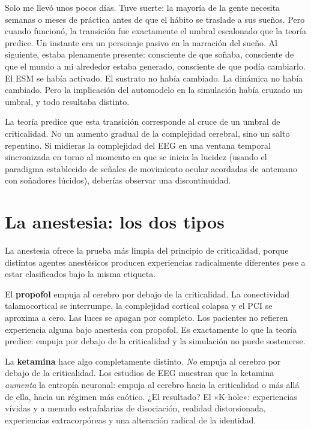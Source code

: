 \documentclass[11pt, twoside, openright]{book}
\begin{document}
Solo me llevó unos pocos días. Tuve suerte: la mayoría de la gente necesita semanas o meses de práctica antes de que el hábito se traslade a sus sueños. Pero cuando funcionó, la transición fue exactamente el umbral escalonado que la teoría predice. Un instante era un personaje pasivo en la narración del sueño. Al siguiente, estaba plenamente presente: consciente de que soñaba, consciente de que el mundo a mi alrededor estaba generado, consciente de que podía cambiarlo. El ESM se había activado. El sustrato no había cambiado. La dinámica no había cambiado. Pero la implicación del automodelo en la simulación había cruzado un umbral, y todo resultaba distinto.

La teoría predice que esta transición corresponde al cruce de un umbral de criticalidad. No un aumento gradual de la complejidad cerebral, sino un salto repentino. Si midieras la complejidad del EEG en una ventana temporal sincronizada en torno al momento en que se inicia la lucidez (usando el paradigma establecido de señales de movimiento ocular acordadas de antemano con soñadores lúcidos), deberías observar una discontinuidad.

\section*{La anestesia: los dos tipos}

La anestesia ofrece la prueba más limpia del principio de criticalidad, porque distintos agentes anestésicos producen experiencias radicalmente diferentes pese a estar clasificados bajo la misma etiqueta.

El \textbf{propofol} empuja al cerebro por debajo de la criticalidad. La conectividad talamocortical se interrumpe, la complejidad cortical colapsa y el PCI se aproxima a cero. Las luces se apagan por completo. Los pacientes no refieren experiencia alguna bajo anestesia con propofol. Es exactamente lo que la teoría predice: empuja por debajo de la criticalidad y la simulación no puede sostenerse.

La \textbf{ketamina} hace algo completamente distinto. \textit{No} empuja al cerebro por debajo de la criticalidad. Los estudios de EEG muestran que la ketamina \textit{aumenta} la entropía neuronal: empuja al cerebro hacia la criticalidad o más allá de ella, hacia un régimen más caótico. ¿El resultado? El «K-hole»: experiencias vívidas y a menudo estrafalarias de disociación, realidad distorsionada, experiencias extracorpóreas y una alteración radical de la identidad.
\end{document}
